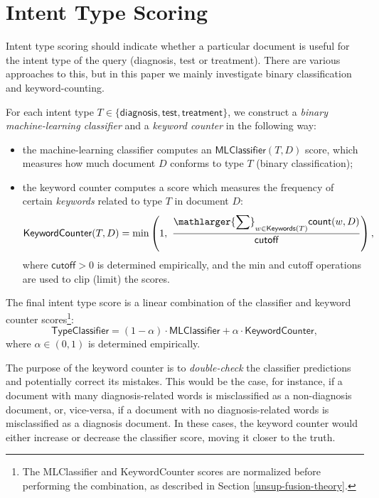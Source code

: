 \section{Intent Type Scoring}\label{intent-scoring}
Intent type scoring should indicate whether a particular document is useful for the intent type of the query
(diagnosis, test or treatment). There are various approaches to this, but in this paper we mainly investigate
binary classification and keyword-counting.

For each intent type $T\in\{\textsf{diagnosis}, \textsf{test}, \textsf{treatment}\}$,
we construct a \emph{binary machine-learning classifier} and a \emph{keyword counter} in the following way:
\begin{itemize}
 \item the machine-learning classifier computes an $\textsf{MLClassifier}(T,D)$ score,
 which measures how much document $D$ conforms to type $T$ (binary classification);
 \item the keyword counter computes a score which measures the frequency of certain \emph{keywords} related to type $T$ in document $D$:
 \begin{equation}\label{basic-formula}
  \textsf{KeywordCounter}(T,D) = \min\left(1,\,\, \displaystyle\frac{\displaystyle\mathlarger{\sum}_{w\in \textsf{Keywords}(T)} \textsf{count}(w,D)}{\textsf{cutoff}}\right),
 \end{equation}
  where $\textsf{cutoff} > 0$ is determined empirically, and the \textsf{min} and \textsf{cutoff} operations are used to
  clip (limit) the scores.
\end{itemize}

The final intent type score is a linear combination of the classifier and keyword counter scores\footnote{The \textsf{MLClassifier} and \textsf{KeywordCounter}
scores are normalized before performing the combination, as described in Section \ref{unsup-fusion-theory}.}:
\begin{equation}\label{clf-combine-formula}
 \textsf{TypeClassifier} = (1-\alpha)\cdot\textsf{MLClassifier} + \alpha\cdot\textsf{KeywordCounter},
\end{equation}
where $\alpha\in (0,1)$ is determined empirically.

The purpose of the keyword counter is to \emph{double-check} the classifier predictions and potentially correct its mistakes.
This would be the case, for instance,
if a document with many diagnosis-related words is misclassified as a non-diagnosis document,
or, vice-versa, if a document with no diagnosis-related words is misclassified as a diagnosis document.
In these cases, the keyword counter would either increase or decrease the classifier score, moving it closer to the truth.


